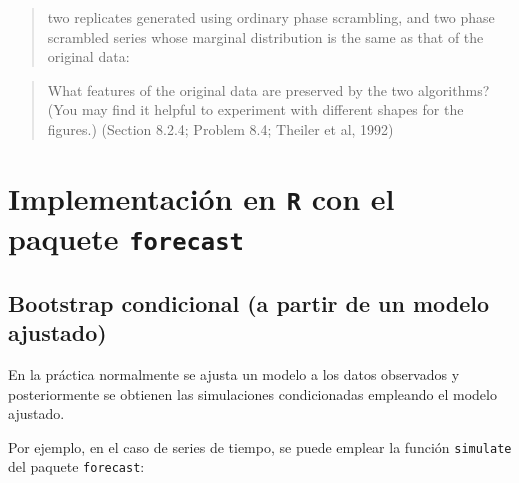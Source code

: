 \documentclass[]{book}
\newenvironment{Shaded}{\begin{snugshade}}{\end{snugshade}}
\newcommand{\KeywordTok}[1]{\textcolor[rgb]{0.13,0.29,0.53}{\textbf{#1}}}
\newcommand{\DecValTok}[1]{\textcolor[rgb]{0.00,0.00,0.81}{#1}}
\newcommand{\StringTok}[1]{\textcolor[rgb]{0.31,0.60,0.02}{#1}}
\newcommand{\CommentTok}[1]{\textcolor[rgb]{0.56,0.35,0.01}{\textit{#1}}}
\newcommand{\OperatorTok}[1]{\textcolor[rgb]{0.81,0.36,0.00}{\textbf{#1}}}
\newcommand{\NormalTok}[1]{#1}
\theoremstyle{definition}
\theoremstyle{definition}
\theoremstyle{definition}
\theoremstyle{remark}
\begin{document}
\begin{quote}
two replicates generated using ordinary phase scrambling, and two phase
scrambled series whose marginal distribution is the same as that of the
original data:
\end{quote}

\begin{Shaded}
\end{Shaded}

\begin{quote}
What features of the original data are preserved by the two algorithms?
(You may find it helpful to experiment with different shapes for the
figures.) (Section 8.2.4; Problem 8.4; Theiler et al, 1992)
\end{quote}

\section{\texorpdfstring{Implementación en \texttt{R} con el paquete
\texttt{forecast}}{Implementación en R con el paquete forecast}}\label{implementacion-en-r-con-el-paquete-forecast}

\subsection{Bootstrap condicional (a partir de un modelo
ajustado)}\label{bootstrap-condicional-a-partir-de-un-modelo-ajustado}

En la práctica normalmente se ajusta un modelo a los datos observados y
posteriormente se obtienen las simulaciones condicionadas empleando el
modelo ajustado.

Por ejemplo, en el caso de series de tiempo, se puede emplear la función
\texttt{simulate} del paquete \texttt{forecast}:
\end{document}
